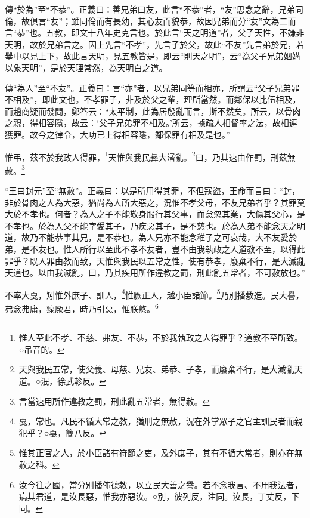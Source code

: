 {\noindent\zhuan{}\fzbyks 傳“於為”至“不恭”。正義曰：善兄弟曰友，此言“不恭”者，“友”思念之辭，兄弟同倫，故俱言“友”；雖同倫而有長幼，其心友而貌恭，故因兄弟而分“友”文為二而言“恭”也。五教，即文十八年史克言也。於此言“天之明道”者，父子天性，不嫌非天明，故於兄弟言之。因上先言“不孝”，先言子於父，故此“不友”先言弟於兄，若舉中以見上下，故此言天明，見五教皆是，即云“則天之明”，云“為父子兄弟姻媾以象天明”，是於天理常然，為天明白之道。 \par}

{\noindent\zhuan{}\fzbyks 傳“為人”至“不友”。正義曰：言“亦”者，以兄弟同等而相亦，所謂云“父子兄弟罪不相及”，即此文也。不孝罪子，非及於父之輩，理所當然。而鄰保以比伍相及，而趙商疑而發問，鄭答云：“太平制，此為居殷亂而言，斯不然矣。所云，以骨肉之親，得相容隱，故云：‘父子兄弟罪不相及。’所云，據疏人相督率之法，故相連獲罪。故今之律令，大功已上得相容隱，鄰保罪有相及是也。” \par}

惟弔，茲不於我政人得罪，\footnote{惟人至此不孝、不慈、弗友、不恭，不於我執政之人得罪乎？道教不至所致。○吊音的。}天惟與我民彝大湣亂。\footnote{天與我民五常，使父義、母慈、兄友、弟恭、子孝，而廢棄不行，是大滅亂天道。○泯，徐武軫反。}曰，乃其速由作罰，刑茲無赦。\footnote{言當速用所作違教之罰，刑此亂五常者，無得赦。}

{\noindent\shu{}\fzkt “王曰封元”至“無赦”。正義曰：以是所用得其罪，不但寇盜，王命而言曰：“封，非於骨肉之人為大惡，猶尚為人所大惡之，況惟不孝父母，不友兄弟者乎？其罪莫大於不孝也。何者？為人之子不能敬身服行其父事，而怠忽其業，大傷其父心，是不孝也。於為人父不能字愛其子，乃疾惡其子，是不慈也。於為人弟不能念天之明道，故乃不能恭事其兄，是不恭也。為人兄亦不能念稚子之可哀哉，大不友愛於弟，是不友也。惟人所行以至此不孝不友者，豈不由我執政之人道教不至，以得此罪乎？既人罪由教而致，天惟與我民以五常之性，使有恭孝，廢棄不行，是大滅亂天道也。以由我滅亂，曰，乃其疾用所作違教之罰，刑此亂五常者，不可赦放也。” \par}

不率大戛，矧惟外庶子、訓人，\footnote{戛，常也。凡民不循大常之教，猶刑之無赦，況在外掌眾子之官主訓民者而親犯乎？○戛，簡八反。}惟厥正人，越小臣諸節。\footnote{惟其正官之人，於小臣諸有符節之吏，及外庶子，其有不循大常者，則亦在無赦之科。}乃別播敷造。民大譽，弗念弗庸，瘝厥君，時乃引惡，惟朕憝。\footnote{汝今往之國，當分別播佈德教，以立民大善之譽。若不念我言、不用我法者，病其君道，是汝長惡，惟我亦惡汝。○別，彼列反，注同。汝長，丁丈反，下同。}


